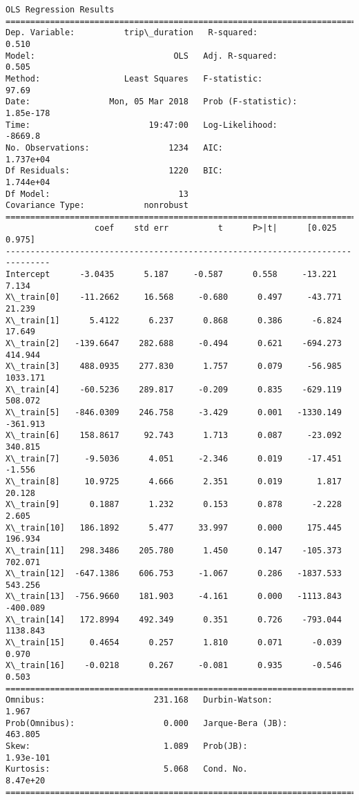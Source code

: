 \documentclass[11pt]{article}
\begin{document}
    \begin{Verbatim}[commandchars=\\\{\}]
                            OLS Regression Results                            
==============================================================================
Dep. Variable:          trip\_duration   R-squared:                       0.510
Model:                            OLS   Adj. R-squared:                  0.505
Method:                 Least Squares   F-statistic:                     97.69
Date:                Mon, 05 Mar 2018   Prob (F-statistic):          1.85e-178
Time:                        19:47:00   Log-Likelihood:                -8669.8
No. Observations:                1234   AIC:                         1.737e+04
Df Residuals:                    1220   BIC:                         1.744e+04
Df Model:                          13                                         
Covariance Type:            nonrobust                                         
===============================================================================
                  coef    std err          t      P>|t|      [0.025      0.975]
-------------------------------------------------------------------------------
Intercept      -3.0435      5.187     -0.587      0.558     -13.221       7.134
X\_train[0]    -11.2662     16.568     -0.680      0.497     -43.771      21.239
X\_train[1]      5.4122      6.237      0.868      0.386      -6.824      17.649
X\_train[2]   -139.6647    282.688     -0.494      0.621    -694.273     414.944
X\_train[3]    488.0935    277.830      1.757      0.079     -56.985    1033.171
X\_train[4]    -60.5236    289.817     -0.209      0.835    -629.119     508.072
X\_train[5]   -846.0309    246.758     -3.429      0.001   -1330.149    -361.913
X\_train[6]    158.8617     92.743      1.713      0.087     -23.092     340.815
X\_train[7]     -9.5036      4.051     -2.346      0.019     -17.451      -1.556
X\_train[8]     10.9725      4.666      2.351      0.019       1.817      20.128
X\_train[9]      0.1887      1.232      0.153      0.878      -2.228       2.605
X\_train[10]   186.1892      5.477     33.997      0.000     175.445     196.934
X\_train[11]   298.3486    205.780      1.450      0.147    -105.373     702.071
X\_train[12]  -647.1386    606.753     -1.067      0.286   -1837.533     543.256
X\_train[13]  -756.9660    181.903     -4.161      0.000   -1113.843    -400.089
X\_train[14]   172.8994    492.349      0.351      0.726    -793.044    1138.843
X\_train[15]     0.4654      0.257      1.810      0.071      -0.039       0.970
X\_train[16]    -0.0218      0.267     -0.081      0.935      -0.546       0.503
==============================================================================
Omnibus:                      231.168   Durbin-Watson:                   1.967
Prob(Omnibus):                  0.000   Jarque-Bera (JB):              463.805
Skew:                           1.089   Prob(JB):                    1.93e-101
Kurtosis:                       5.068   Cond. No.                     8.47e+20
==============================================================================


\end{Verbatim}
\end{document}
